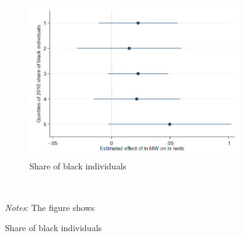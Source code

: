 \begin{figure}[htb]
\begin{subfigure}{0.5\textwidth}
    \end{subfigure}\\
    \begin{subfigure}{0.5\textwidth} \centering
        \includegraphics[width=0.99\linewidth]{analysis/first_differences/output/fd_static_heter_black_share2010.png}
        \caption{Share of black individuals} \label{appfig:fd_heterogeneity_work_county}
    \end{subfigure}\\
    \begin{minipage}{.95\textwidth} \footnotesize
		\vspace{2mm} 
		\textit{Notes}: The figure shows 
	\end{minipage}
\end{figure}

